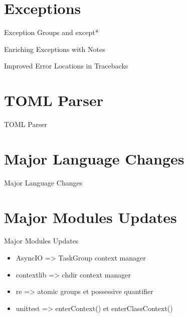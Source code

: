 \documentclass[aspectratio=169, xetex, 12pt]{beamer}
\begin{document}
    \section{Exceptions}
    \begin{frame}{Exception Groups and except*}
    \end{frame}

    \begin{frame}{Enriching Exceptions with Notes}
    \end{frame}

    \begin{frame}{Improved Error Locations in Tracebacks}
    \end{frame}

    \section{TOML Parser}
    \begin{frame}{TOML Parser}
    \end{frame}

    \section{Major Language Changes}
    \begin{frame}{Major Language Changes}
    \end{frame}

    \section{Major Modules Updates}
    \begin{frame}{Major Modules Updates}
        \begin{block}{}
            \begin{itemize}
                \item AsyncIO => TaskGroup context manager
                \item contextlib => chdir context manager
                \item re => atomic groups et possessive quantifier
                \item unittest => enterContext() et enterClassContext()
            \end{itemize}
        \end{block}
    \end{frame}
\end{document}
